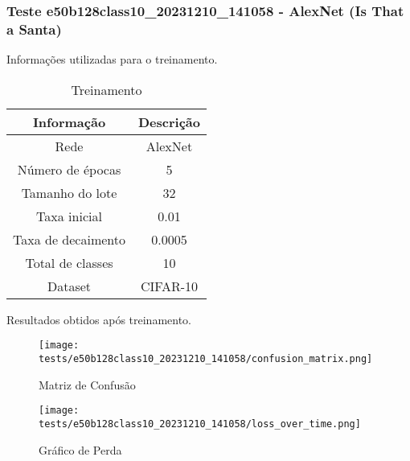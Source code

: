 \subsubsection{Teste e50b128class10_20231210_141058 - AlexNet (Is That a Santa)}

Informações utilizadas para o treinamento.

\begin{table}[ht]
   \centering
   \caption{Treinamento}
   \label{tab:modelos}
   \begin{tabular}{| c | c | }
      \hline 
      \textbf{Informação} & \textbf{Descrição} \\
      \hline \hline 
      Rede & AlexNet \\
      \hline
      Número de épocas & 5\\
      \hline
      Tamanho do lote & 32\\
      \hline
      Taxa inicial & 0.01 \\
      \hline
      Taxa de decaimento & 0.0005 \\
      \hline
      Total de classes & 10\\
      \hline
      Dataset & CIFAR-10\\
      \hline
   \end{tabular} 
\end{table}

Resultados obtidos após treinamento.


\begin{figure}[ht]
 \begin{center}
   \texttt{[image: tests/e50b128class10\_20231210\_141058/confusion\_matrix.png]}
  \caption{Matriz de Confusão}
  \label{fig:fig03}
 \end{center}
\end{figure}

\begin{figure}[ht]
 \begin{center}
   \texttt{[image: tests/e50b128class10\_20231210\_141058/loss\_over\_time.png]}
  \caption{Gráfico de Perda}
  \label{fig:fig04}
 \end{center}
\end{figure}
